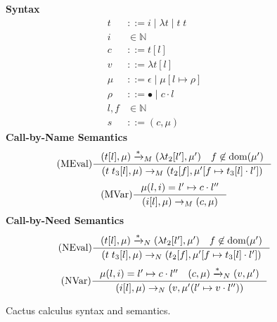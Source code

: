 \begin{figure*}
\textbf{Syntax}
\begin{align*}
\tag{Term} t &::= i \; | \; \lambda t \; | \; t \; t  \\
\tag{Variable} i &\in \mathbb{N}  \\
\tag{Closure} c &::= t [l] \\
\tag{Value} v &::= \lambda t [l] \\
\tag{Heap} \mu &::= \epsilon \; | \; \mu [ l \mapsto \rho ] \\
\tag{Environment} \rho &::= \bullet \; | \; c \cdot l \\
\tag{Location} l,f &\in \mathbb{N}  \\
\tag{State} s &::= (c, \mu)
\end{align*}
\textbf{Call-by-Name Semantics}
\begin{align*}
\tag{MEval} \inference
{(t[l], \mu) \xrightarrow{* }_{M} (\lambda t_2[l'], \mu') \quad f \not \in \textnormal{dom}(\mu')}
{(t \; t_3[l], \mu) \rightarrow_{M} (t_2[f], \mu'[f \mapsto t_3[l] \cdot l'])}  
\end{align*}
\begin{align*}
\tag{MVar} \inference 
{\mu(l, i) = l' \mapsto c \cdot l''}
{(i[l],\mu) \rightarrow_M (c,\mu)}
\end{align*}
\textbf{Call-by-Need Semantics}
\begin{align*}
\tag{NEval} \inference
{(t[l], \mu) \xrightarrow{* }_{N} (\lambda t_2[l'], \mu') \quad f \not \in \textnormal{dom}(\mu')}
{(t \; t_3[l], \mu) \rightarrow_{N} (t_2[f], \mu'[f \mapsto t_3[l] \cdot l'])}  
\end{align*}
\begin{align*}
\tag{NVar} \inference
{\mu(l, i) = l' \mapsto c \cdot l'' \quad (c, \mu) \xrightarrow{* }_{N} (v, \mu')}
{(i[l],\mu) \rightarrow_N (v, \mu'(l' \mapsto v \cdot l''))}
\end{align*}
\caption{Cactus calculus syntax and semantics.}
\label{fig:calccact}
\end{figure*}

